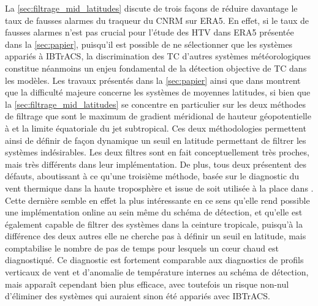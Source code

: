 \documentclass[../main.tex]{subfiles}
\begin{document}
La \cref{sec:filtrage_mid_latitudes} discute de trois façons de réduire davantage le taux de fausses alarmes du traqueur du CNRM sur ERA5. En effet, si le taux
de fausses alarmes n'est pas crucial pour l'étude des HTV dans ERA5 présentée dans la \cref{sec:papier}, puisqu'il est possible de ne sélectionner que les
systèmes appariés à IBTrACS, la discrimination des TC d'autres systèmes météorologiques constitue néanmoins un enjeu fondamental de la détection objective de TC
dans les modèles. Les travaux présentés dans la \cref{sec:papier} ainsi que dans \textcite{bourdin_intercomparison_2022} montrent que la difficulté majeure
concerne les systèmes de moyennes latitudes, si bien que la \cref{sec:filtrage_mid_latitudes} se concentre en particulier sur les deux méthodes de filtrage que
sont le maximum de gradient méridional de hauteur géopotentielle à  et la limite équatoriale du jet subtropical. Ces deux méthodologies permettent
ainsi de définir de façon dynamique un seuil en latitude permettant de filtrer les systèmes indésirables. Les deux filtres sont en fait conceptuellement très
proches, mais très différents dans leur implémentation. De plus, tous deux présentent des défauts, aboutissant à ce qu'une troisième méthode, basée sur le
diagnostic du vent thermique dans la haute troposphère et issue de \textcite{hart_cyclone_2003} soit utilisée à la place dans \textcite{dulac_assessing_2023}.
Cette dernière semble en effet la plus intéressante en ce sens qu'elle rend possible une implémentation online au sein même du schéma de détection, et qu'elle
est également capable de filtrer des systèmes dans la ceinture tropicale, puisqu'à la différence des deux autres elle ne cherche pas à définir un seuil en
latitude, mais comptabilise le nombre de pas de temps pour lesquels un cœur chaud est diagnostiqué. Ce diagnostic est fortement comparable aux diagnostics
de profils verticaux de vent et d'anomalie de température internes au schéma de détection, mais apparaît cependant bien plus efficace, avec toutefois un risque
non-nul d'éliminer des systèmes qui auraient sinon été appariés avec IBTrACS.
\end{document}
